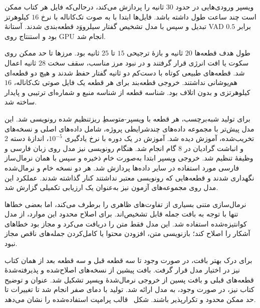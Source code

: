 
ویسپر ورودی‌هایی در حدود $30$ ثانیه را پردازش می‌کند، درحالی‌که فایل هر کتاب ممکن است چند ساعت طول داشته باشد. فایل‌ها ابتدا با  به صوت تک‌کاناله با نرخ $16$ کیلوهرتز تبدیل و سپس با مدل تشخیص گفتار سیلرووَد قطعه‌بندی شدند. آستانهٔ VAD برابر $0.5$ بود و استنتاج روی GPU انجام شد.

طول هدف قطعه‌ها $20$ ثانیه و بازهٔ ترجیحی $15$ تا $25$ ثانیه بود. مرزها تا حد ممکن روی سکوت یا افت انرژی قرار گرفتند و در نبود مرز مناسب، سقف سخت $28$ ثانیه اعمال شد. قطعه‌های طبیعی کوتاه با دست‌کم دو ثانیه گفتار حفظ شدند و هیچ دو قطعه‌ای هم‌پوشانی نداشتند. خروجی قطعه‌بند برای هر قطعه یک فایل صوتی تک‌کاناله، $16$ کیلوهرتزی و بدون اتلاف بود. شناسه قطعه از شناسه منبع و شماره‌ای ترتیبی و پایدار ساخته شد.


برای تولید شبه‌برچسب، هر قطعه با ویسپر-متوسطِ ریزتنظیم شده رونویسی شد. این مدل پیش‌تر با مجموعه داده‌های چندشرایطی پروژه، شامل داده‌های اصلی و نسخه‌های تخریب‌شده، آموزش دیده شد. آموزش در یک دوره با نرخ یادگیری $10^{-5}$، اندازهٔ دسته $2$ و انباشت گرادیان در $8$ گام انجام شد. هنگام رونویسی نیز مدل روی زبان فارسی و وظیفهٔ  تنظیم شد.
خروجی ویسپر ابتدا به‌صورت خام ذخیره و سپس با همان نرمال‌ساز فارسی مورد استفاده در سایر داده‌ها پردازش شد. هر دو نسخه خام و نرمال‌شده نگهداری شدند و قطعه‌هایی که رونویسی معتبر نداشتند کنار گذاشته شدند. عملکرد این مدل روی مجموعه‌های آزمون نیز به‌عنوان یک ارزیابی تکمیلی گزارش شد.




نرمال‌سازی متنی بسیاری از تفاوت‌های ظاهری را برطرف می‌کند، اما بعضی خطاها تنها با توجه به بافت جمله قابل تشخیص‌اند. برای اصلاح محدود این موارد، از مدل کوانتیزه‌شده  استفاده شد. این مدل فقط متن را دریافت می‌کرد و مجاز بود خطاهای آشکار را اصلاح کند؛ بازنویسی متن، افزودن محتوا یا کامل‌کردن جمله‌های ناقص مجاز نبود.

برای درک بهتر بافت، در صورت وجود تا سه قطعه قبل و سه قطعه بعد از همان کتاب نیز در اختیار مدل قرار گرفت. بافت پیشین از نسخه‌های اصلاح‌شده و پذیرفته‌شدهٔ قطعه‌های قبلی و بافت پسین از خروجی نرمال‌شدهٔ ویسپر تشکیل شد. عنوان و توضیح کتاب نیز، در صورت وجود، به مدل ارائه شد. تولید با دمای صفر انجام شد تا تغییرات تا حد ممکن محدود و تکرارپذیر باشند. شکل~ قالب پرامپت استفاده‌شده را نشان می‌دهد.

